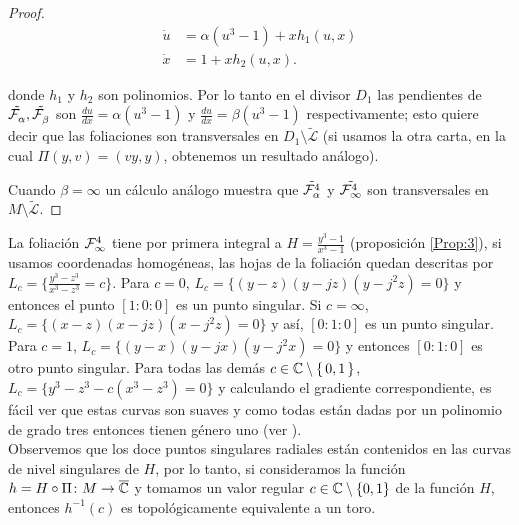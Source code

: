 \begin{proof}
\begin{align*}
\dot{u}&= \alpha(u^{3}-1) + xh_{1}(u,x)\\
\dot{x}&= 1 + xh_{2}(u,x).
\end{align*}  

\noindent donde $h_{1}$ y $h_{2}$ son polinomios. Por lo tanto en el divisor $D_{1}$ las pendientes de $\tilde{\Fol{\alpha}},\tilde{\Fol{\beta}}$ son $\tfrac{du}{dx}=\alpha(u^{3}-1)$ y $\tfrac{du}{dx}=\beta(u^{3}-1)$ respectivamente; esto quiere decir que las foliaciones son transversales en $D_{1}\setminus\tilde{\mathcal{L}}$ (si usamos la otra carta, en la cual $\Pi(y,v)=(vy,y)$, obtenemos un resultado análogo).

\noindent Cuando $\beta=\infty$ un cálculo análogo muestra que $\tilde{\Foli_{\alpha}^{4}}$ y $\tilde{\Foli_{\infty}^{4}}$ son transversales en $M\setminus\tilde{\mathcal{L}}$. 
\end{proof}


La foliación $\Fol[4]{\infty}$ tiene por primera integral a $H=\tfrac{y^{3}-1}{x^{3}-1}$ (proposición \ref{Prop:3}), si usamos coordenadas homogéneas, las hojas de la foliación quedan descritas por $L_{c}=\{\tfrac{y^{3}-z^{3}}{x^{3}-z^{3}}=c\}$. Para $c=0$, $L_{c}=\{(y-z)(y-jz)(y-j^{2}z)=0\}$ y entonces el punto $[1:0:0]$ es un punto singular. Si $c=\infty$, $L_{c}=\{(x-z)(x-jz)(x-j^{2}z)=0\}$ y así, $[0:1:0]$ es un punto singular. Para $c=1$, $L_{c}=\{(y-x)(y-jx)(y-j^{2}x)=0\}$ y entonces $[0:1:0]$ es otro punto singular. Para todas las demás $c\in\C\setminus\{\, 0,1\, \}$, $L_{c}=\{y^{3}-z^{3}-c(x^{3}-z^{3})=0\}$ y calculando el gradiente correspondiente, es fácil ver que estas curvas son suaves y como todas están dadas por un polinomio de grado tres entonces tienen género uno (ver \cite{FischerGerd}).\\

Observemos que los doce puntos singulares radiales están contenidos en las curvas de nivel singulares de $H$, por lo tanto, si consideramos la función $h=H\circ\Pi\colon M\rightarrow\overline{\C}$ y tomamos un valor regular $c\in\C\setminus\{0,1\}$ de la función $H$, entonces $h^{-1}(c)$ es topológicamente equivalente a un toro.

